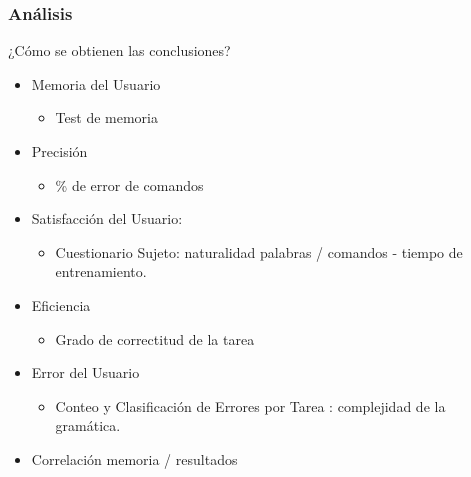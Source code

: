 \subsubsection{An\'alisis}
¿C\'omo se obtienen las conclusiones?
\begin{itemize}
    \item Memoria del Usuario
    \begin{itemize}
        \item Test de memoria
    \end{itemize}
    \item Precisi\'on
    \begin{itemize}
        \item \% de error de comandos
    \end{itemize}
    \item Satisfacci\'on del Usuario:
    \begin{itemize}
        \item Cuestionario Sujeto: naturalidad palabras / comandos - tiempo de entrenamiento.   
    \end{itemize}
    \item Eficiencia
    \begin{itemize}
        \item Grado de correctitud de la tarea
    \end{itemize}
    \item Error del Usuario
    \begin{itemize}
        \item Conteo y Clasificaci\'on de Errores por Tarea : complejidad de la gram\'atica.
    \end{itemize}
    \item Correlaci\'on memoria / resultados
\end{itemize}

